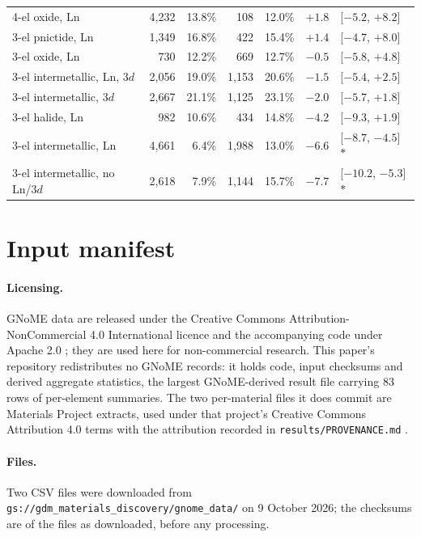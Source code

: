 \documentclass[11pt]{article}
\begin{document}
\begin{table}[htbp]
\begin{tabular}{lrrrrrl}
4-el oxide, Ln & 4{,}232 & 13.8\% & 108 & 12.0\% & $+1.8$ & [$-5.2$, $+8.2$] \\
3-el pnictide, Ln & 1{,}349 & 16.8\% & 422 & 15.4\% & $+1.4$ & [$-4.7$, $+8.0$] \\
3-el oxide, Ln & 730 & 12.2\% & 669 & 12.7\% & $-0.5$ & [$-5.8$, $+4.8$] \\
3-el intermetallic, Ln, 3$d$ & 2{,}056 & 19.0\% & 1{,}153 & 20.6\% & $-1.5$ & [$-5.4$, $+2.5$] \\
3-el intermetallic, 3$d$ & 2{,}667 & 21.1\% & 1{,}125 & 23.1\% & $-2.0$ & [$-5.7$, $+1.8$] \\
3-el halide, Ln & 982 & 10.6\% & 434 & 14.8\% & $-4.2$ & [$-9.3$, $+1.9$] \\
3-el intermetallic, Ln & 4{,}661 & 6.4\% & 1{,}988 & 13.0\% & $-6.6$ & [$-8.7$, $-4.5$] $\ast$ \\
3-el intermetallic, no Ln/3$d$ & 2{,}618 & 7.9\% & 1{,}144 & 15.7\% & $-7.7$ & [$-10.2$, $-5.3$] $\ast$ \\
\bottomrule
\end{tabular}
\end{table}

\section{Input manifest}\label{app:manifest}

\paragraph{Licensing.} GNoME data are released under the Creative Commons
Attribution-NonCommercial 4.0 International licence and the accompanying code under
Apache 2.0 \citep{gnomedataset}; they are used here for non-commercial research. This
paper's repository redistributes no GNoME records: it holds code, input checksums and
derived aggregate statistics, the largest GNoME-derived result file carrying 83 rows of
per-element summaries. The two per-material files it does commit are Materials Project
extracts, used under that project's Creative Commons Attribution 4.0 terms with the
attribution recorded in \texttt{results/PROVENANCE.md} \citep{jain2013}.

\paragraph{Files.} Two CSV files were downloaded from
\texttt{gs://gdm\_materials\_discovery/gnome\_data/} on 9 October 2026; the checksums
are of the files as downloaded, before any processing.
\end{document}
